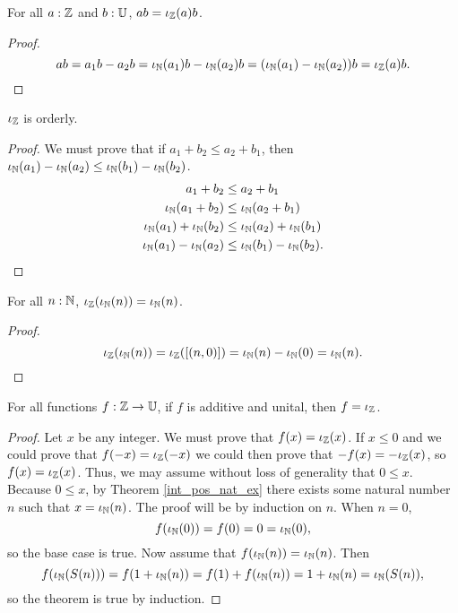 \documentclass[../../math.tex]{subfiles}
\begin{document}
\begin{theorem}
    For all $a : \mathbb{Z}$ and $b : \mathbb{U}$, $ab = \iota_{\mathbb{Z}}(a)b$.
\end{theorem}
\begin{proof}
    \[
        ab = a_1b - a_2b = \iota_{\mathbb{N}}(a_1)b - \iota_{\mathbb{N}}(a_2)b = (\iota_{\mathbb{N}}(a_1) - \iota_{\mathbb{N}}(a_2))b
        = \iota_{\mathbb{Z}}(a)b.
    \]
\end{proof}

\begin{instance}
    $\iota_{\mathbb{Z}}$ is orderly.
\end{instance}
\begin{proof}
    We must prove that if $a_1 + b_2 \leq a_2 + b_1$, then $\iota_{\mathbb{N}}(a_1) - \iota_{\mathbb{N}}(a_2)
    \leq \iota_{\mathbb{N}}(b_1) - \iota_{\mathbb{N}}(b_2)$.
    \begin{align*}
        a_1 + b_2 &\leq a_2 + b_1 \\
        \iota_{\mathbb{N}}(a_1 + b_2) &\leq \iota_{\mathbb{N}}(a_2 + b_1) \\
        \iota_{\mathbb{N}}(a_1) + \iota_{\mathbb{N}}(b_2) &\leq \iota_{\mathbb{N}}(a_2) + \iota_{\mathbb{N}}(b_1) \\
        \iota_{\mathbb{N}}(a_1) - \iota_{\mathbb{N}}(a_2) &\leq \iota_{\mathbb{N}}(b_1) - \iota_{\mathbb{N}}(b_2).
    \end{align*}
\end{proof}

\begin{theorem}
    For all $n : \mathbb{N}$, $\iota_{\mathbb{Z}}(\iota_{\mathbb{N}}(n)) = \iota_{\mathbb{N}}(n)$.
\end{theorem}
\begin{proof}
    \[
        \iota_{\mathbb{Z}}(\iota_{\mathbb{N}}(n)) = \iota_{\mathbb{Z}}([(n, 0)]) = \iota_{\mathbb{N}}(n) - \iota_{\mathbb{N}}(0) = \iota_{\mathbb{N}}(n).
    \]
\end{proof}

\begin{theorem} \label{from_int_unique}
    For all functions $f : \mathbb{Z} \to \mathbb{U}$, if $f$ is additive and unital, then $f =
    \iota_{\mathbb{Z}}$.
\end{theorem}
\begin{proof}
    Let $x$ be any integer.  We must prove that $f(x) = \iota_{\mathbb{Z}}(x)$.  If $x \leq 0$
    and we could prove that $f(-x) = \iota_{\mathbb{Z}}(-x)$ we could then prove that $-f(x) =
    -\iota_{\mathbb{Z}}(x)$, so $f(x) = \iota_{\mathbb{Z}}(x)$.  Thus, we may assume without loss of
    generality that $0 \leq x$.  Because $0 \leq x$, by Theorem
    \ref{int_pos_nat_ex} there exists some natural number $n$ such that $x =
    \iota_{\mathbb{N}}(n)$.  The proof will be by induction on $n$.  When $n = 0$,
    \[
        f(\iota_{\mathbb{N}}(0)) = f(0) = 0 = \iota_{\mathbb{N}}(0),
    \]
    so the base case is true.  Now assume that $f(\iota_{\mathbb{N}}(n)) = \iota_{\mathbb{N}}(n)$.  Then
    \[
        f(\iota_{\mathbb{N}}(S(n))) = f(1 + \iota_{\mathbb{N}}(n)) = f(1) + f(\iota_{\mathbb{N}}(n)) = 1 + \iota_{\mathbb{N}}(n) =
        \iota_{\mathbb{N}}(S(n)),
    \]
    so the theorem is true by induction.
\end{proof}
\end{document}
